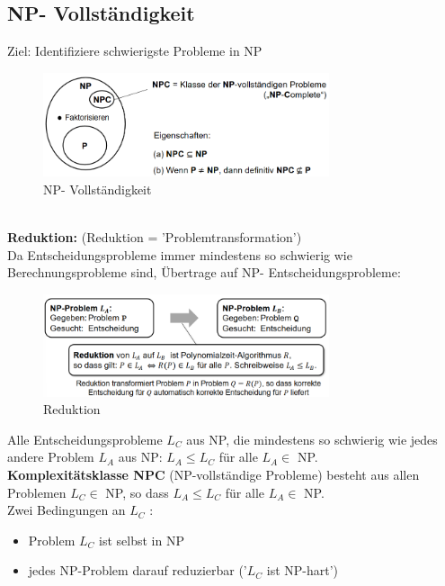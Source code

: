\documentclass{article}
\begin{document}
        \subsection{NP- Vollständigkeit}
            Ziel: Identifiziere schwierigste Probleme in NP
            \begin{figure}[ht]
                \centering
                \includegraphics[width=0.75\textwidth]{Bilder/NPV.png}
                \caption{NP- Vollständigkeit}
                \label{fig:NPV}
            \end{figure}\\
            \textbf{Reduktion:} (Reduktion = 'Problemtransformation')\\
            Da Entscheidungsprobleme immer mindestens so schwierig wie Berechnungsprobleme sind, Übertrage auf NP- Entscheidungsprobleme:\\
            \begin{figure}[ht]
                \centering
                \includegraphics[width=0.75\textwidth]{Bilder/Reduktion.png}
                \caption{Reduktion}
                \label{fig:Reduktion}
            \end{figure}
            \newpage
            Alle Entscheidungsprobleme $L_C$ aus NP, die mindestens so schwierig wie jedes andere Problem $L_A$ aus NP: $L_A \leq L_C$ für alle $L_A\in$ NP.\\
            \textbf{Komplexitätsklasse NPC} (NP-vollständige Probleme) besteht aus allen Problemen $L_C\in$ NP, so dass $L_A\leq L_C$ für alle $L_A\in$ NP.\\
            Zwei Bedingungen an $L_C$ :
            \begin{itemize}
                \item Problem $L_C$ ist selbst in NP
                \item jedes NP-Problem darauf reduzierbar ('$L_C$ ist NP-hart')
            \end{itemize}
\end{document}
